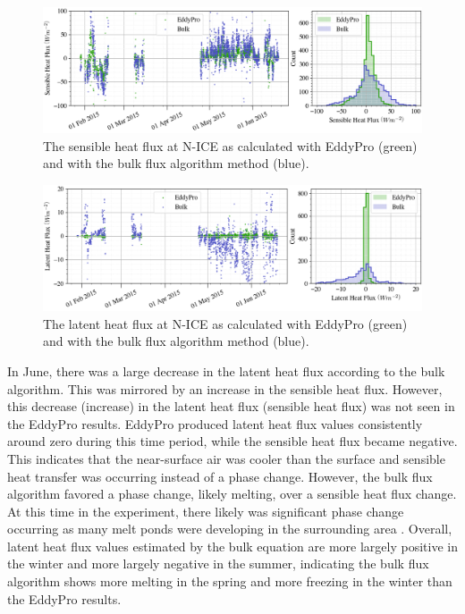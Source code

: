 \begin{figure}[t!]
    \centering
    \includegraphics[width=1\linewidth]{figures/chapter5/BulkSensible.png}
    \caption[Sensible heat flux from a bulk flux method compared to EddyPro.]{The sensible heat flux at N-ICE as calculated with EddyPro (green) and with the bulk flux algorithm method (blue).}
    \label{fig:bulk:sensible}
\end{figure}
\begin{figure}[t!]
    \centering
    \includegraphics[width=1\linewidth]{figures/chapter5/BulkLatent.png}
    \caption[Latent heat flux from a bulk flux method compared to EddyPro.]{The latent heat flux at N-ICE as calculated with EddyPro (green) and with the bulk flux algorithm method (blue).}
    \label{fig:bulk:latent}
\end{figure}

In June, there was a large decrease in the latent heat flux according to the bulk algorithm. This was mirrored by an increase in the sensible heat flux. However, this decrease (increase) in the latent heat flux (sensible heat flux) was not seen in the EddyPro results. EddyPro produced latent heat flux values consistently around zero during this time period, while the sensible heat flux became negative. This indicates that the near-surface air was cooler than the surface and sensible heat transfer was occurring instead of a phase change. However, the bulk flux algorithm favored a phase change, likely melting, over a sensible heat flux change. At this time in the experiment, there likely was significant phase change occurring as many melt ponds were developing in the surrounding area \citep{walden:2017}. Overall, latent heat flux values estimated by the bulk equation are more largely positive in the winter and more largely negative in the summer, indicating the bulk flux algorithm shows more melting in the spring and more freezing in the winter than the EddyPro results. 

